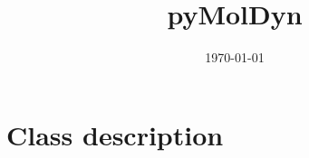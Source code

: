 \documentclass[final, oneside, a4paper, 11pt, pdftex, english]{scrreprt}
\begin{document}
\title{pyMolDyn}
\date{\today}
\maketitle

\tableofcontents


\chapter{Class description}

\end{document}
